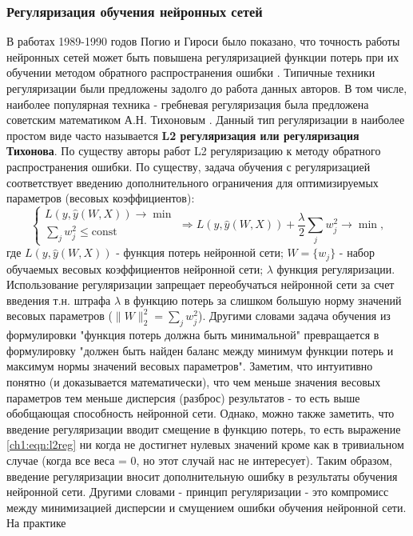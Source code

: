 \documentclass[12pt]{article}
\begin{document}
\begin{sloppypar}
\subsubsection{Регуляризация обучения нейронных сетей}
В работах 1989-1990 годов Погио и Гироси было показано, что точность работы нейронных сетей может быть повышена регуляризацией функции потерь при их обучении методом обратного распространения ошибки    \cite{poggio1989theory, girosi1995regularization}. Типичные техники регуляризации были предложены задолго до работа данных авторов. В том числе, наиболее популярная техника - гребневая регуляризация была предложена советским математиком А.Н. Тихоновым \cite{tihonov1963solution, tihonov1965rigeregr}. Данный тип регуляризации в наиболее простом виде часто называется \textbf{L2 регуляризация или регуляризация Тихонова}. По существу авторы работ \cite{poggio1989theory, girosi1995regularization} L2 регуляризацию к методу обратного распространения ошибки. По существу, задача обучения с регуляризацией соответствует введению дополнительного ограничения для оптимизируемых параметров (весовых коэффициентов):
\begin{equation}
\label{ch1:eqn:l2reg}
    \begin{cases} 
    L\left(y,\hat{y}(W,X)\right)\to \min 
        \\
    \sum_j w_j^2 \leq \mbox{const}
    \end{cases} 
    \Rightarrow 
    L\left(y,\hat{y}(W,X)\right) + \dfrac{\lambda}{2} \sum_j w_j^2 \to \min,
\end{equation}
где $ L\left(y,\hat{y}(W,X)\right)$ - функция потерь нейронной сети; $W=\{w_j\}$ - набор обучаемых весовых коэффициентов нейронной сети; $\lambda$ функция регуляризации. 
Использование регуляризации запрещает переобучаться нейронной сети за счет введения т.н. штрафа $\lambda$ в функцию потерь за слишком большую норму значений весовых параметров  ($\|W\|_2^2=\sum_j w_j^2$). Другими словами задача обучения из формулировки "функция потерь должна быть минимальной" превращается в формулировку "должен быть найден баланс между минимум функции потерь и максимум нормы значений весовых параметров". Заметим, что интуитивно понятно (и доказывается математически), что чем меньше значения весовых параметров тем меньше дисперсия (разброс) результатов - то есть выше обобщающая способность нейронной сети. Однако, можно также заметить, что введение регуляризации вводит смещение в функцию потерь, то есть выражение \ref{ch1:eqn:l2reg} ни когда не достигнет нулевых значений кроме как в тривиальном случае (когда все веса = 0, но этот случай нас не интересует). Таким образом, введение регуляризации вносит дополнительную ошибку в результаты обучения нейронной сети. Другими словами - принцип регуляризации - это компромисс между минимизацией дисперсии и смущением ошибки обучения нейронной сети. На практике 

\end{sloppypar}
\end{document}
